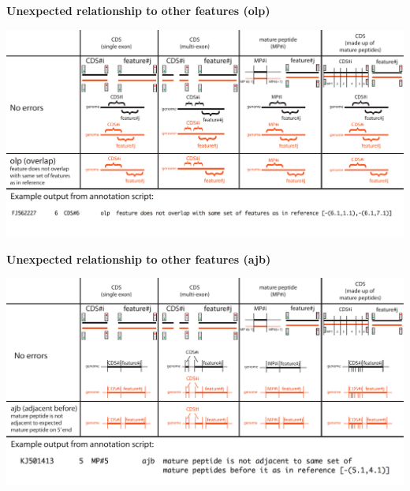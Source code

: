\documentclass[landscape]{slides}
\begin{document}
\begin{slide}
\begin{center}
\textbf{Unexpected relationship to other features (olp)}
\vspace{0.5in}

\includegraphics[width=10in]{figs/errornew-3-olp}
\end{center}
\vfill
\end{slide}
\begin{slide}
\begin{center}
\textbf{Unexpected relationship to other features (ajb)}
\vspace{0.5in}

\includegraphics[width=10in]{figs/errornew-4-ajb}
\end{center}
\vfill
\end{slide}
\end{document}
